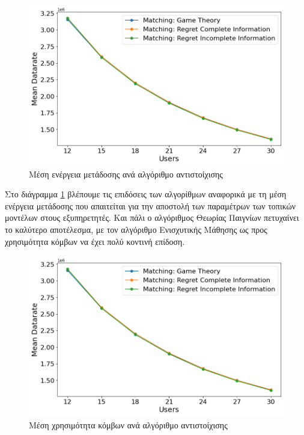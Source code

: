 \begin{figure}[H]
    \centering
    \includegraphics[width=\textwidth]{figures/chapter4/Mean_Datarate_vs_Users.png}
    \caption{Μέση ενέργεια μετάδοσης ανά αλγόριθμο αντιστοίχισης}
    \label{fig13}
\end{figure}

Στο διάγραμμα \ref*{fig13} βλέπουμε τις επιδόσεις των αλγορίθμων αναφορικά με τη μέση ενέργεια μετάδοσης που απαιτείται για την αποστολή των παραμέτρων των τοπικών μοντέλων στους εξυπηρετητές. Και πάλι ο αλγόριθμος Θεωρίας Παιγνίων πετυχαίνει το καλύτερο αποτέλεσμα, με τον αλγόριθμο Ενισχυτικής Μάθησης ως προς χρησιμότητα κόμβων να έχει πολύ κοντινή επίδοση. 

\begin{figure}[H]
    \centering
    \includegraphics[width=\textwidth]{figures/chapter4/Mean_Datarate_vs_Users.png}
    \caption{Μέση χρησιμότητα κόμβων ανά αλγόριθμο αντιστοίχισης}
    \label{fig14}
\end{figure}

